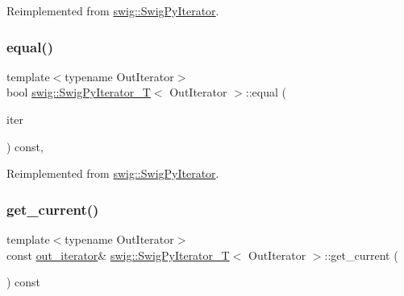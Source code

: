 Reimplemented from \hyperlink{structswig_1_1_swig_py_iterator_a76881aa4c938f5915badd57fc7da074c}{swig\+::\+Swig\+Py\+Iterator}.

\mbox{\label{classswig_1_1_swig_py_iterator___t_a14f2ba114f370932df0bf1ab06d0a5e2}} 
\subsubsection{\texorpdfstring{equal()}{equal()}}
{\footnotesize\ttfamily template$<$typename Out\+Iterator$>$ \\
bool \hyperlink{classswig_1_1_swig_py_iterator___t}{swig\+::\+Swig\+Py\+Iterator\+\_\+T}$<$ Out\+Iterator $>$\+::equal (\begin{DoxyParamCaption}\item[{const \hyperlink{structswig_1_1_swig_py_iterator}{Swig\+Py\+Iterator} \&}]{iter }\end{DoxyParamCaption}) const\hspace{0.3cm}{\ttfamily [inline]}, {\ttfamily [virtual]}}



Reimplemented from \hyperlink{structswig_1_1_swig_py_iterator_ab6fc2cfd1457e734739cf3d4bfe39456}{swig\+::\+Swig\+Py\+Iterator}.

\mbox{\label{classswig_1_1_swig_py_iterator___t_a5079275c680963f14ba496ebd4f07c7b}} 
\subsubsection{\texorpdfstring{get\+\_\+current()}{get\_current()}}
{\footnotesize\ttfamily template$<$typename Out\+Iterator$>$ \\
const \hyperlink{classswig_1_1_swig_py_iterator___t_aec35545038c3d804975a147253f061e4}{out\+\_\+iterator}\& \hyperlink{classswig_1_1_swig_py_iterator___t}{swig\+::\+Swig\+Py\+Iterator\+\_\+T}$<$ Out\+Iterator $>$\+::get\+\_\+current (\begin{DoxyParamCaption}{ }\end{DoxyParamCaption}) const\hspace{0.3cm}{\ttfamily [inline]}}



